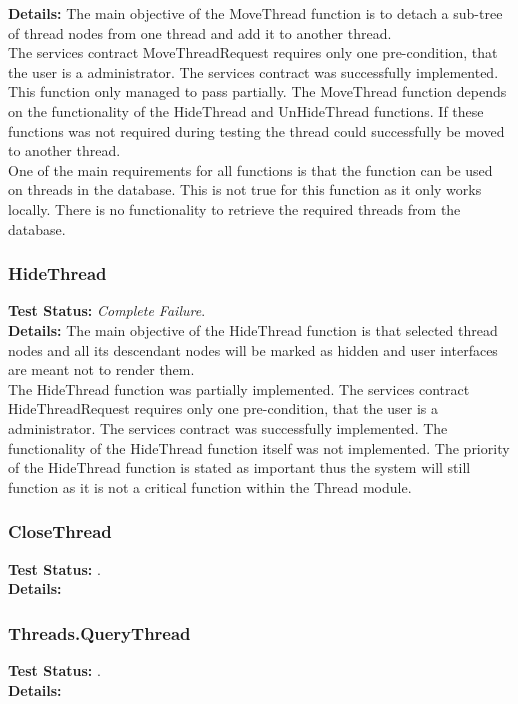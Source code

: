 \begin{flushleft}
\begin{flushleft}
	\textbf{Details:}
	The main objective of the MoveThread function is to detach a sub-tree of thread nodes from one thread and add it to another thread.\\
	The services contract MoveThreadRequest requires only one pre-condition, that the user is a administrator.
	The services contract was successfully implemented. This function only managed to pass partially. The MoveThread function depends on the functionality of the HideThread and UnHideThread functions. If these functions was not required during testing the thread could successfully be moved to another thread.\\
	One of the main requirements for all functions is that the function can be used on threads in the database. This is not true for this function as it only works locally. There is no functionality to retrieve the required threads from the database.

\end{flushleft}

\subsubsection{HideThread}
\begin{flushleft}
	\textbf{Test Status:} \emph{Complete Failure}. \\

	\textbf{Details:}
	The main objective of the HideThread function is that selected thread nodes and all	its descendant nodes will be marked as hidden and user interfaces are meant not to render them.\\
	The HideThread function was partially implemented. The services contract HideThreadRequest requires only one pre-condition, that the user is a administrator. The services contract was successfully implemented. The functionality of the HideThread function itself was not implemented. The priority of the HideThread function is stated as important thus the system will still function as it is not a critical function within the Thread module.
  
\end{flushleft}

\subsubsection{CloseThread}
\begin{flushleft}
	\textbf{Test Status:} \emph{}. \\

	\textbf{Details:}
	
\end{flushleft}

\subsubsection{Threads.QueryThread}
\begin{flushleft}
	\textbf{Test Status:} \emph{}. \\

	\textbf{Details:}
	
\end{flushleft}

\end{flushleft}

